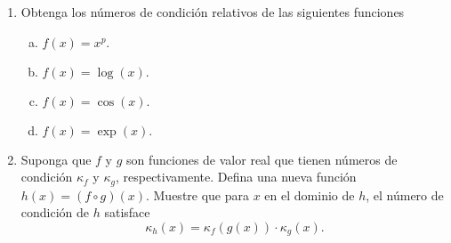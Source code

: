 \documentclass[
	spanish,
	8pt,
	utf8,
	xcolor=table,
	handout,
	aspectratio=169,
	professionalfonts,
	notheorems,
	mathserif,
]{beamer}
\begin{document}
\begin{frame}
	\begin{enumerate}
		\item

		      Obtenga los números de condición relativos de las
		      siguientes funciones

		      \begin{multicols}{4}
			      \begin{enumerate}[a)]

				      \item

				            \begin{math}
					            f\left(x\right)=
					            x^{p}.
				            \end{math}

				      \item

				            \begin{math}
					            f\left(x\right)=
					            \log\left(x\right).
				            \end{math}


				      \item

				            \begin{math}
					            f\left(x\right)=
					            \cos\left(x\right).
				            \end{math}

				      \item

				            \begin{math}
					            f\left(x\right)=
					            \exp\left(x\right).
				            \end{math}
			      \end{enumerate}
		      \end{multicols}
		\item

		      Suponga que $f$ y $g$ son funciones de valor real que
		      tienen números de condición $\kappa_{f}$ y $\kappa_{g}$,
		      respectivamente.
		      Defina una nueva función
		      \begin{math}
			      h\left(x\right)=
			      \left(f\circ g\right)
			      \left(x\right)
		      \end{math}.
		      Muestre que para $x$ en el dominio de $h$, el número de
		      condición de $h$ satisface
		      \begin{equation*}
			      \kappa_{h}\left(x\right)=
			      \kappa_{f}\left(g\left(x\right)\right)\cdot
			      \kappa_{g}\left(x\right).
		      \end{equation*}


\end{enumerate}
\end{frame}
\end{document}
